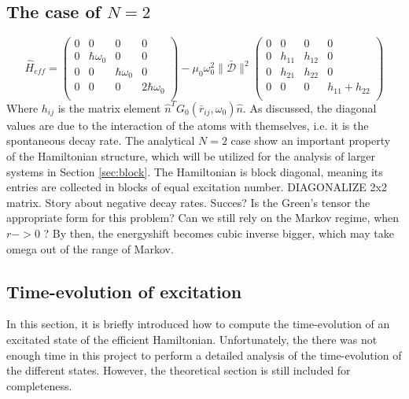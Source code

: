 \documentclass{article}
\begin{document}
\subsection{The case of $N=2$}\label{sec:N2}

\begin{equation}\label{eq:N2_general}
    \hat{H}_{eff} = 
    \begin{pmatrix}
        0 & 0 & 0 & 0 \\
        0 & \hbar \omega_0 & 0 & 0 \\
        0 & 0 & \hbar \omega_0 & 0 \\
        0 & 0 & 0 & 2 \hbar \omega_0 \\
    \end{pmatrix}
    - \mu_0 \omega_0^2 \| \bar{\mathscr{D}} \|^2
    \begin{pmatrix}
        0 & 0 & 0 & 0 \\
        0 & h_{11} & h_{12} & 0 \\
        0 & h_{21} & h_{22} & 0 \\
        0 & 0 & 0 & h_{11} + h_{22} \\
    \end{pmatrix}
\end{equation}
Where $h_{ij}$ is the matrix element $\hat{n}^T G_0(\bar{r}_{ij},\omega_0) \hat{n}$. As discussed, the diagonal values are due to the interaction of the atoms with themselves, i.e. it is the spontaneous decay rate. The analytical $N=2$ case show an important property of the Hamiltonian structure, which will be utilized for the analysis of larger systems in Section \ref{sec:block}. The Hamiltonian is block diagonal, meaning its entries are collected in blocks of equal excitation number. DIAGONALIZE 2x2 matrix. Story about negative decay rates. Succes? Is the Green's tensor the appropriate form for this problem? Can we still rely on the Markov regime, when $r->0$ ? By then, the energyshift becomes cubic inverse bigger, which may take omega out of the range of Markov.

\subsection{Time-evolution of excitation}\label{sec:time-evolution}

In this section, it is briefly introduced how to compute the time-evolution of an excitated state of the efficient Hamiltonian. Unfortunately, the there was not enough time in this project to perform a detailed analysis of the time-evolution of the different states. However, the theoretical section is still included for completeness.
\end{document}
